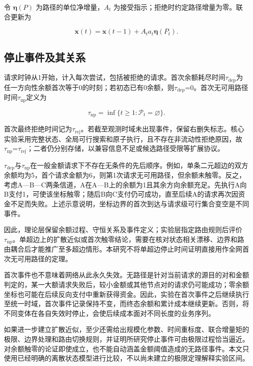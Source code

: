 \documentclass[UTF8,a4paper,twocolumn,fontset=none,zihao=5]{ctexart}
\begin{document}
令 $\boldsymbol\eta(P)$ 为路径的单位净增量，$A_t$ 为接受指示；拒绝时约定路径增量为零。联合更新为



\begin{equation}
\boldsymbol x(t)=\boldsymbol x(t-1)+A_ta_t\boldsymbol\eta(P_t).
\label{eq:4}\end{equation}


\subsection{停止事件及其关系}

请求时钟从1开始，计入每次尝试，包括被拒绝的请求。首次余额耗尽时间$\tau_{\mathrm{dep}}$为任一方向性余额首次等于0的时刻；若初态已有0余额，则$\tau_{\mathrm{dep}}$=0。首次无可用路径时间$\tau_{\mathrm{np}}$定义为



\begin{equation}
\tau_{\mathrm{np}}=\inf\{t\geq1:\mathcal P_t=\varnothing\}.
\label{eq:5}\end{equation}


首次最终拒绝时间记为$\tau_{\mathrm{rej}}$。若截至观测时域未出现事件，保留右删失标志。核心实验采用完整状态、全局可行搜索和原子执行，且不存在非流动性拒绝原因，故$\tau_{\mathrm{np}}$=$\tau_{\mathrm{rej}}$；二者仍分别存储，以兼容信息不足或候选路径受限等扩展协议。


$\tau_{\mathrm{dep}}$与$\tau_{\mathrm{np}}$在一般金额请求下不存在无条件的先后顺序。例如，单条二元超边的双方余额均为5，首个请求金额为6，则第1次请求无可用路径，但余额未触零。反之，考虑A—B—C两条信道，A在A—B上的余额为1且其余方向余额充足。先执行A向B支付1，可使该坐标触零；随后B向C支付仍可成功，直至后续A的请求再次因资金不足而失败。上述示意说明，坐标边界的首次到达与请求级可行集合变空是不同事件。


因此，理论层保留余额过程、守恒关系及事件定义；实验层指定路由规则后评价$\tau_{\mathrm{np}}$。单超边上的扩散近似或首次触零结论，需要在核对状态相关漂移、边界和路由耦合后才能推广至多超边情形。本研究不将单超边停止时间证明直接用作全网首次无可用路径的定理。


首次事件也不意味着网络从此永久失效。无路径是针对当前请求的源目的对和金额判定的，某一大额请求失败后，较小金额或其他节点对的请求仍可能成功；零余额坐标也可能在后续反向支付中重新获得资金。因此，实验在首次事件之后继续执行至统一时域，首次事件记录保持不变，而终态余额和累计成本继续更新。否则，将不同变体在各自失效时停止，会使后续成本面对不同长度的业务序列。


如果进一步建立扩散近似，至少还需给出规模化参数、时间重标度、联合增量矩的极限、边界处理和路由切换规则，并证明所研究停止事件可由极限过程恰当逼近。对余额触零的论证即使成立，也不能自动涵盖金额阈值造成的无路径事件。本文只使用已经明确的离散状态模型进行比较，不以尚未建立的极限定理解释实验区间。
\end{document}
